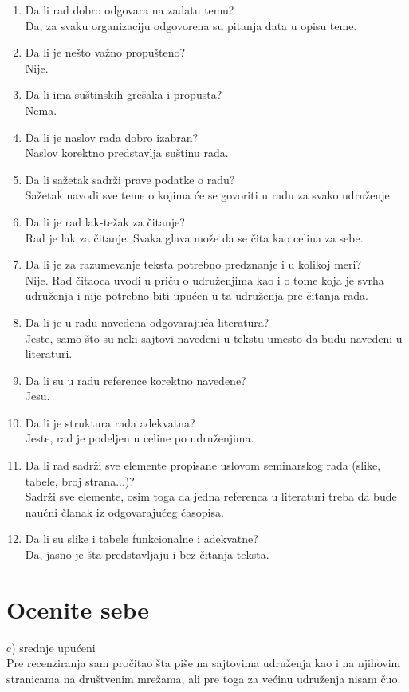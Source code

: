 \documentclass[a4paper]{report}
\begin{document}
\begin{enumerate}
\item Da li rad dobro odgovara na zadatu temu?\\
Da, za svaku organizaciju odgovorena su pitanja data u opisu teme.
\item Da li je nešto važno propušteno?\\
Nije.
\item Da li ima suštinskih grešaka i propusta?\\
Nema.
\item Da li je naslov rada dobro izabran?\\
Naslov korektno predstavlja suštinu rada.
\item Da li sažetak sadrži prave podatke o radu?\\
Sažetak navodi sve teme o kojima će se govoriti u radu za svako udruženje.
\item Da li je rad lak-težak za čitanje?\\
Rad je lak za čitanje. Svaka glava može da se čita kao celina za sebe.
\item Da li je za razumevanje teksta potrebno predznanje i u kolikoj meri?\\
Nije. Rad čitaoca uvodi u priču o udruženjima kao i o tome koja je svrha udruženja i nije potrebno biti upućen u ta udruženja pre čitanja rada.
\item Da li je u radu navedena odgovarajuća literatura?\\
Jeste, samo što su neki sajtovi navedeni u tekstu umesto da budu navedeni u literaturi.
\item Da li su u radu reference korektno navedene?\\
Jesu.
\item Da li je struktura rada adekvatna?\\
Jeste, rad je podeljen u celine po udruženjima.
\item Da li rad sadrži sve elemente propisane uslovom seminarskog rada (slike, tabele, broj strana...)?\\
Sadrži sve elemente, osim toga da jedna referenca u literaturi treba da bude naučni članak iz odgovarajućeg časopisa.
\item Da li su slike i tabele funkcionalne i adekvatne?\\
Da, jasno je šta predstavljaju i bez čitanja teksta.
\end{enumerate}

\section{Ocenite sebe}
c) srednje upućeni\\
Pre recenziranja sam pročitao šta piše na sajtovima udruženja kao i na njihovim stranicama na društvenim mrežama, ali pre toga za većinu udruženja nisam čuo.
\end{document}
